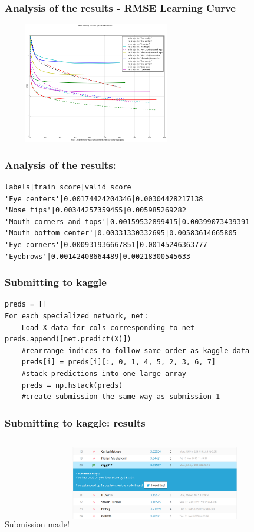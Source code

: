 \documentclass{beamer}
\begin{document}
\begin{frame}
\frametitle{Analysis of the results - RMSE Learning Curve}
\includegraphics[width=310px,height=200px]{RMSE_learn_net2s.png}
\end{frame}



\begin{frame}[fragile]
\frametitle{Analysis of the results:}
\begin{verbatim}
labels|train score|valid score
'Eye centers'|0.00174424204346|0.00304428217138
'Nose tips'|0.00344257359455|0.005985269282
'Mouth corners and tops'|0.00159532899415|0.00399073439391
'Mouth bottom center'|0.00331330332695|0.00583614665805
'Eye corners'|0.000931936667851|0.00145246363777
'Eyebrows'|0.00142408664489|0.00218300545633
\end{verbatim}
\end{frame}

\begin{frame}[fragile]
\frametitle{Submitting to kaggle}
\begin{verbatim}
preds = []
For each specialized network, net:
    Load X data for cols corresponding to net preds.append([net.predict(X)])
    #rearrange indices to follow same order as kaggle data
    preds[i] = preds[i][:, 0, 1, 4, 5, 2, 3, 6, 7]
    #stack predictions into one large array
    preds = np.hstack(preds)
    #create submission the same way as submission 1
\end{verbatim}
\end{frame}


\begin{frame}[fragile]
\frametitle{Submitting to kaggle: results}
\begin{block}{Submission made!}
\includegraphics[width=280px,height=150px]{net2_sub.png}
\end{block}
\end{frame}
\end{document}
